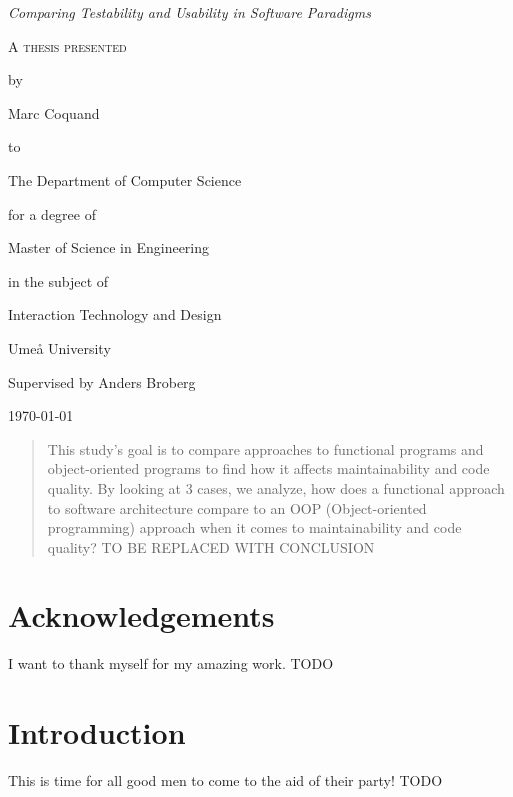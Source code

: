 \documentclass[12pt]{article}
\theoremstyle{definition}
\theoremstyle{theorem}
\begin{document}
\begin{titlepage}
	\centering
    \null
    \vfill
    {\Large\itshape Comparing Testability and Usability in Software Paradigms
    \par}
    \vspace{3.0cm}
	{\scshape 
    A thesis presented \par 
    by\par
	Marc Coquand\par
	to\par
    The Department of Computer Science\par
    \vspace{0.8cm}
	for a degree of\par
    Master of Science in Engineering\par
    in the subject of\par
    Interaction Technology and Design\par}
    \vfill
    Umeå University\par
    Supervised by Anders Broberg\par
	\today\par
\end{titlepage}
\clearpage
\thispagestyle{empty}

\clearpage\newpage
\thispagestyle{empty}

\begin{abstract} 

    This study's goal is to compare approaches to functional programs and
    object-oriented programs to find how it affects maintainability and code
    quality. By looking at 3 cases, we analyze, how does a functional approach
    to software architecture compare to an OOP (Object-oriented programming)
    approach when it comes to maintainability and code quality? TO BE REPLACED
    WITH CONCLUSION

\end{abstract}

\clearpage\newpage
\thispagestyle{empty}

\section*{Acknowledgements}

I want to thank myself for my amazing work. TODO

\clearpage\newpage
\thispagestyle{empty}

\tableofcontents
\newpage

\section{Introduction}
This is time for all good men to come to the aid of their party! TODO
\end{document}

